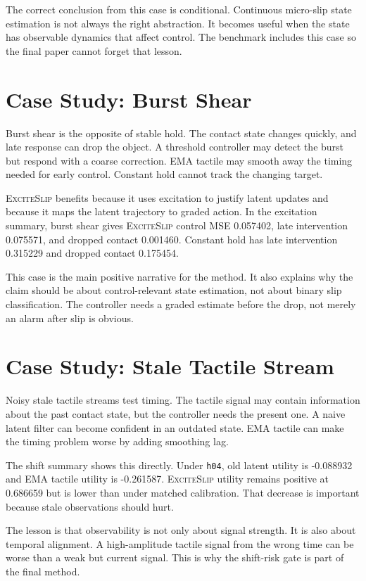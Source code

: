\documentclass{article}
\newcommand{\method}{\textsc{ExciteSlip}\xspace}
\begin{document}
The correct conclusion from this case is conditional. Continuous micro-slip state estimation is not always the right abstraction. It becomes useful when the state has observable dynamics that affect control. The benchmark includes this case so the final paper cannot forget that lesson.

\section{Case Study: Burst Shear}

Burst shear is the opposite of stable hold. The contact state changes quickly, and late response can drop the object. A threshold controller may detect the burst but respond with a coarse correction. EMA tactile may smooth away the timing needed for early control. Constant hold cannot track the changing target.

\method benefits because it uses excitation to justify latent updates and because it maps the latent trajectory to graded action. In the excitation summary, burst shear gives \method control MSE 0.057402, late intervention 0.075571, and dropped contact 0.001460. Constant hold has late intervention 0.315229 and dropped contact 0.175454.

This case is the main positive narrative for the method. It also explains why the claim should be about control-relevant state estimation, not about binary slip classification. The controller needs a graded estimate before the drop, not merely an alarm after slip is obvious.

\section{Case Study: Stale Tactile Stream}

Noisy stale tactile streams test timing. The tactile signal may contain information about the past contact state, but the controller needs the present one. A naive latent filter can become confident in an outdated state. EMA tactile can make the timing problem worse by adding smoothing lag.

The shift summary shows this directly. Under \texttt{h04}, old latent utility is -0.088932 and EMA tactile utility is -0.261587. \method utility remains positive at 0.686659 but is lower than under matched calibration. That decrease is important because stale observations should hurt.

The lesson is that observability is not only about signal strength. It is also about temporal alignment. A high-amplitude tactile signal from the wrong time can be worse than a weak but current signal. This is why the shift-risk gate is part of the final method.
\end{document}
